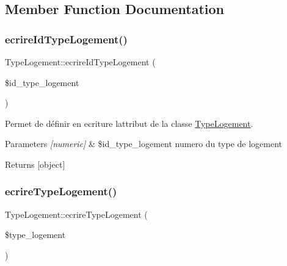 \subsection{Member Function Documentation}
\mbox{\label{class_type_logement_a3a9b66cd5946223b48e7f4dd5697f36a}} 
\subsubsection{\texorpdfstring{ecrire\+Id\+Type\+Logement()}{ecrireIdTypeLogement()}}
{\footnotesize\ttfamily Type\+Logement\+::ecrire\+Id\+Type\+Logement (\begin{DoxyParamCaption}\item[{}]{\$id\+\_\+type\+\_\+logement }\end{DoxyParamCaption})}



Permet de définir en ecriture l\textquotesingle{}attribut de la classe \hyperlink{class_type_logement}{Type\+Logement}. 


\begin{DoxyParams}{Parameters}
{\em \mbox{[}numeric\mbox{]}} & \$id\+\_\+type\+\_\+logement numero du type de logement \\
\hline
\end{DoxyParams}
\begin{DoxyReturn}{Returns}
\mbox{[}object\mbox{]} 
\end{DoxyReturn}
\mbox{\label{class_type_logement_aebc6c44c0bedae48c034d3ca01b753d7}} 
\subsubsection{\texorpdfstring{ecrire\+Type\+Logement()}{ecrireTypeLogement()}}
{\footnotesize\ttfamily Type\+Logement\+::ecrire\+Type\+Logement (\begin{DoxyParamCaption}\item[{}]{\$type\+\_\+logement }\end{DoxyParamCaption})}



